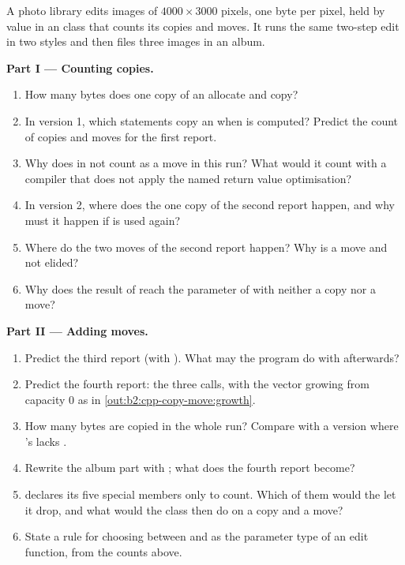 \begin{problem}\label{pb:b2:cpp-copy-move:1}
A photo library edits images of $4000 \times 3000$ pixels, one byte per pixel, held by value in an  class
that counts its copies and moves. It runs the same two-step edit in two styles and then files three images in an
album.

\label{lst:b2:cpp-copy-move:pipeline}

\medskip\noindent\textbf{Part I --- Counting copies.}\par\nopagebreak
\begin{enumerate}[beginpenalty=10000]
\item How many bytes does one copy of an  allocate and copy?
\item In version 1, which statements copy an  when  is computed? Predict the count of copies and
moves for the first report.
\item Why does  in  not count as a move in this run? What would it count with a
compiler that does not apply the named return value optimisation?
\item In version 2, where does the one copy of the second report happen, and why must it happen if  is
used again?
\item Where do the two moves of the second report happen? Why is  a move and not elided?
\item Why does the result of  reach the parameter of  with neither a copy nor a move?
\end{enumerate}

\medskip\noindent\textbf{Part II --- Adding moves.}\par\nopagebreak
\begin{enumerate}[resume, beginpenalty=10000]
\item Predict the third report (with ). What may the program do with  afterwards?
\item Predict the fourth report: the three  calls, with the vector growing from capacity 0 as in
\cref{out:b2:cpp-copy-move:growth}.
\item How many bytes are copied in the whole run? Compare with a version where 's  lacks
.
\item Rewrite the album part with ; what does the fourth report become?
\item {} declares its five special members only to count. Which of them would the  let it
drop, and what would the class then do on a copy and a move?
\item State a rule for choosing between  and  as the parameter type of an edit
function, from the counts above.
\end{enumerate}


\end{problem}
